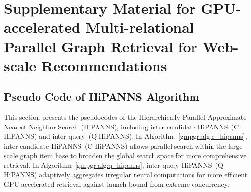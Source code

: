 \chapter{Supplementary Material for GPU-accelerated Multi-relational Parallel Graph Retrieval for Web-scale Recommendations}
\label{app:gmpgr}

\section{Pseudo Code of HiPANNS Algorithm}\label{gmpgr:sec:appendix_pseudocode}

This section presents the pseudocodes of the Hierarchically Parallel Approximate Nearest Neighbor Search~(HiPANNS), including inter-candidate HiPANNS~(C-HiPANNS) and inter-query~(Q-HiPANNS).
In Algorithm~\ref{gmpgr:alg:c_hipanns}, inter-candidate HiPANNS~(C-HiPANNS) allows parallel search within the large-scale graph item base to broaden the global search space for more comprehensive retrieval.
In Algorithm~\ref{gmpgr:alg:q_hipanns}, inter-query HiPANNS~(Q-HiPANNS) adaptively aggregates irregular neural computations for more efficient GPU-accelerated retrieval against launch bound from extreme concurrency.



\begin{algorithm}
    \caption{Inter-candidate HiPANNS.}
    \label{gmpgr:alg:c_hipanns}
    \LinesNumbered
\end{algorithm}

